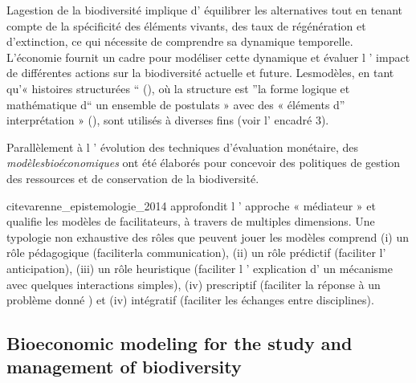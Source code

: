 \begin{displayquote}
\begin{displayquote}
\begin{displayquote}
{{{ 
    Lagestion de la biodiversité implique d' équilibrer les alternatives tout en tenant compte de la spécificité des éléments vivants, des taux de régénération et d'extinction, ce qui nécessite de comprendre sa dynamique temporelle. L'économie fournit un cadre pour modéliser cette dynamique et évaluer l ' impact de différentes actions sur la biodiversité actuelle et future. Lesmodèles, en tant qu'« histoires structurées “ (\citep{GibbardVarian}), où la structure est ”la forme logique et mathématique d“ un ensemble de postulats » avec des « éléments d” interprétation » (\citep{GibbardVarian}), sont utilisés à diverses fins (voir l' encadré 3).

Parallèlement à l ' évolution des techniques d'évaluation monétaire, des \textit{modèlesbioéconomiques } ont été élaborés pour concevoir des politiques de gestion des ressources et de conservation de la biodiversité.

\begin{tcolorbox}[breakable, 
colback=verylightgray, 
colframe=gray!75!black, 
title= {Box 3 - What do models do? },
fontupper=\small]


cite{varenne_epistemologie_2014} approfondit l ' approche « médiateur » et qualifie les modèles de facilitateurs, à travers de multiples dimensions. Une typologie non exhaustive des rôles que peuvent jouer les modèles comprend (i) un rôle pédagogique (faciliterla communication), (ii) un rôle prédictif (faciliter l' anticipation), (iii) un rôle heuristique (faciliter l ' explication d' un mécanisme avec quelques interactions simples), (iv) prescriptif (faciliter la réponse à un problème donné ) et (iv) intégratif (faciliter les échanges entre disciplines). 

\end{tcolorbox}

{}
\subsection*{Bioeconomic modeling for the study and management of biodiversity}

}}}
\end{displayquote}
\end{displayquote}
\end{displayquote}
